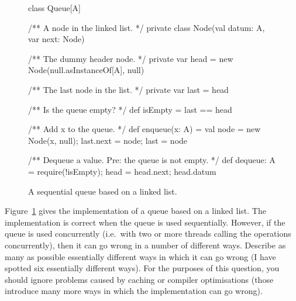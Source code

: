 \begin{question}
\begin{figure}
\begin{scala}
class Queue[A]{
  /** A node in the linked list. */
  private class Node(val datum: A, var next: Node)

  /** The dummy header node. */
  private var head = new Node(null.asInstanceOf[A], null)

  /** The last node in the list. */
  private var last = head

  /** Is the queue empty? */
  def isEmpty = last == head

  /** Add x to the queue. */
  def enqueue(x: A) = {
    val node = new Node(x, null); last.next = node; last = node
  }

  /** Dequeue a value.  Pre: the queue is not empty. */
  def dequeue: A = {
    require(!isEmpty); head = head.next; head.datum
  }
}
\end{scala}
\caption{A sequential queue based on a linked list.}
\label{fig:queue}
\end{figure}

Figure~\ref{fig:queue} gives the implementation of a queue based on a linked
list.  The implementation is correct when the queue is used sequentially.
However, if the queue is used concurrently (i.e.~with two or more threads
calling the operations concurrently), then it can go wrong in a number of
different ways.  
%
Describe as many as possible essentially different ways in which it can go
wrong (I have spotted six essentially different ways).
%
For the purposes of this question, you should ignore problems caused by
caching or compiler optimisations (those introduce many more ways in which the
implementation can go wrong).
\end{question}


